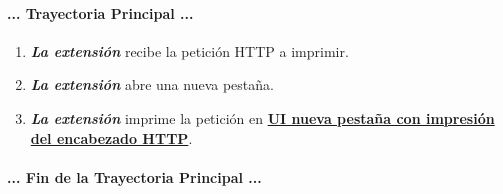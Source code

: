 \documentclass[12pt, a4paper, titlepage]{report}
\begin{document}
				\paragraph{... Trayectoria Principal ...}
				\begin{enumerate}
				    \item \textbf{\textit{La extensión}} recibe la petición HTTP a imprimir.
					\item \textbf{\textit{La extensión}} abre una nueva pestaña.
					\item \textbf{\textit{La extensión}} imprime la petición en \hyperref[UI_tabDatos_4.9]{\textbf{UI nueva pestaña con impresión del encabezado HTTP}}.
				\end{enumerate}
				\paragraph{... Fin de la Trayectoria Principal ...}

		
\end{document}
